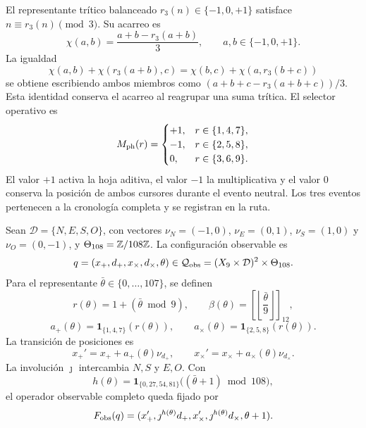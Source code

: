 El representante trítico balanceado \(r_3(n)\in\{-1,0,+1\}\) satisface
\(n\equiv r_3(n)\pmod3\). Su acarreo es
\[
 \chi(a,b)=\frac{a+b-r_3(a+b)}3,\qquad
 a,b\in\{-1,0,+1\}.
\]
La igualdad
\[
 \chi(a,b)+\chi(r_3(a+b),c)
 =\chi(b,c)+\chi(a,r_3(b+c))
\]
se obtiene escribiendo ambos miembros como
\((a+b+c-r_3(a+b+c))/3\). Esta identidad conserva el acarreo
al reagrupar una suma trítica. El selector operativo es
\[
 M_{\rm ph}(r)=
 \begin{cases}
 +1,&r\in\{1,4,7\},\\
 -1,&r\in\{2,5,8\},\\
 0,&r\in\{3,6,9\}.
 \end{cases}
\]
El valor \(+1\) activa la hoja aditiva, el valor \(-1\) la
multiplicativa y el valor \(0\) conserva la posición de ambos cursores
durante el evento neutral. Los tres eventos pertenecen a la cronología
completa y se registran en la ruta.

Sean \(\mathcal D=\{N,E,S,O\}\), con vectores
\(\nu_N=(-1,0)\), \(\nu_E=(0,1)\), \(\nu_S=(1,0)\) y
\(\nu_O=(0,-1)\), y \(\Theta_{108}=\mathbb Z/108\mathbb Z\). La configuración
observable es
\[
 q=(x_+,d_+,x_\times,d_\times,\theta)
 \in\mathcal Q_{\rm obs}=(X_9\times\mathcal D)^2\times\Theta_{108}.
\]
Para el representante \(\bar\theta\in\{0,\ldots,107\}\), se definen
\[
 r(\theta)=1+(\bar\theta\bmod9),\qquad
 \beta(\theta)=\left[\left\lfloor\frac{\bar\theta}{9}\right\rfloor\right]_{12},
\]
\[
 a_+(\theta)=\mathbf1_{\{1,4,7\}}(r(\theta)),\qquad
 a_\times(\theta)=\mathbf1_{\{2,5,8\}}(r(\theta)).
\]
La transición de posiciones es
\[
 x_+'=x_++a_+(\theta)\nu_{d_+},\qquad
 x_\times'=x_\times+a_\times(\theta)\nu_{d_\times}.
\]
La involución \(\jmath\) intercambia \(N,S\) y \(E,O\). Con
\[
 h(\theta)=\mathbf1_{\{0,27,54,81\}}\bigl((\bar\theta+1)\bmod108\bigr),
\]
el operador observable completo queda fijado por
\[
 F_{\rm obs}(q)=
 (x_+',\jmath^{h(\theta)}d_+,x_\times',
   \jmath^{h(\theta)}d_\times,\theta+1).
\]

